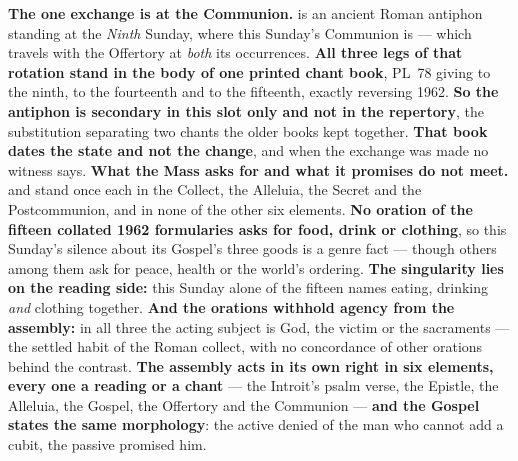 \textbf{The one exchange is at the Communion.}
 is an ancient Roman antiphon standing at the
\emph{Ninth} Sunday, where this Sunday's Communion is
 --- which travels with the Offertory at
\emph{both} its occurrences. \textbf{All three legs
of that rotation stand in the body of one printed chant book}, PL~78 giving
 to the ninth,  to the
fourteenth and  to the fifteenth, exactly
reversing 1962. \textbf{So the antiphon is secondary in this slot only and not
in the repertory}, the substitution separating two chants the older books kept
together. \textbf{That book dates the state and not the change}, and when the
exchange was made no witness says.
\textbf{What the Mass asks for and what it promises do not meet.}
 and  stand once each in the Collect, the Alleluia,
the Secret and the Postcommunion, and in none of the other six elements. \textbf{No oration of the fifteen collated 1962 formularies
asks for food, drink or clothing}, so this Sunday's silence about its Gospel's
three goods is a genre fact --- though others among them ask for peace, health
or the world's ordering. \textbf{The singularity lies on the reading side:} this
Sunday alone of the fifteen names eating, drinking \emph{and} clothing together.
\textbf{And the orations withhold agency from the assembly:} in all three the
acting subject is God, the victim or the sacraments --- the settled habit of
the Roman collect, with no concordance of other orations behind the contrast.
\textbf{The assembly acts in its own right in six elements, every one a reading
or a chant} --- the Introit's psalm verse, the Epistle, the Alleluia, the
Gospel, the Offertory and the
Communion --- \textbf{and the Gospel states the same morphology}: the
active denied of the man who cannot add a cubit, the passive promised him.

\label{triptych:brief-synthesis:end}
\clearpage
